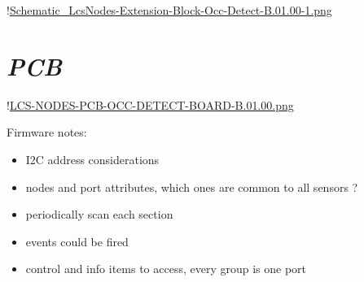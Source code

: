 !\href{./Schematics/Schematic_LcsNodes-Extension-Block-Occ-Detect-B.01.00-4.png }{Schematic_LcsNodes-Extension-Block-Occ-Detect-B.01.00-1.png}

\section{\textit{PCB}}

!\href{./Boards/LCS-NODES-PCB-OCC-DETECT-BOARD-B.01.00.png }{LCS-NODES-PCB-OCC-DETECT-BOARD-B.01.00.png}


Firmware notes:
\begin{itemize}
\item I2C address considerations
\item nodes and port attributes, which ones are common to all sensors ?
\item periodically scan each section
\item events could be fired
\item control and info items to access, every group is one port
\end{itemize}

